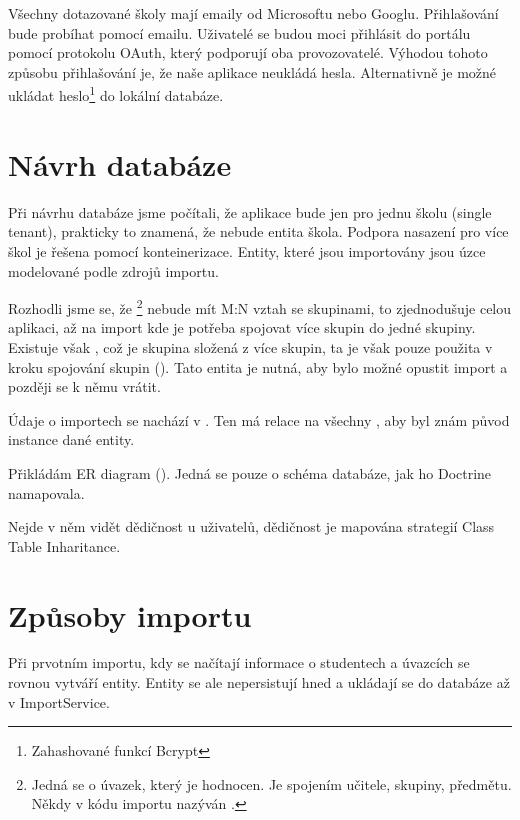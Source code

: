 Všechny dotazované školy mají emaily od Microsoftu nebo Googlu.
Přihlašování bude probíhat pomocí emailu. Uživatelé se budou moci přihlásit do portálu pomocí protokolu OAuth, který podporují oba provozovatelé. Výhodou tohoto způsobu přihlašování je, že naše aplikace neukládá hesla. Alternativně je možné ukládat heslo\footnote{Zahashované funkcí Bcrypt} do lokální databáze.



\section{Návrh databáze}

Při návrhu databáze jsme počítali, že aplikace bude jen pro jednu školu (single tenant), prakticky to znamená, že nebude entita škola. 
Podpora nasazení pro více škol je řešena pomocí konteinerizace.
Entity, které jsou importovány jsou úzce modelované podle zdrojů importu.

Rozhodli jsme se, že \footnote{Jedná se o úvazek, který je hodnocen. Je spojením učitele, skupiny, předmětu. Někdy v kódu importu nazýván .} 
nebude mít M:N vztah se skupinami, to zjednodušuje celou aplikaci, až na import kde je potřeba spojovat více skupin do jedné skupiny.
Existuje však , což je skupina složená z více skupin, ta je však pouze použita v kroku spojování skupin ().
Tato entita je nutná, aby bylo možné opustit import a později se k němu vrátit.

Údaje o importech se nachází v . Ten má relace na všechny , aby byl znám původ instance dané entity.

Přikládám ER diagram (). Jedná se pouze o schéma databáze, jak ho Doctrine namapovala.

Nejde v něm vidět dědičnost u uživatelů, dědičnost je mapována strategií Class Table Inharitance\cite{P-of-EAA}.






\section{Způsoby importu}
Při prvotním importu, kdy se načítají informace o studentech a úvazcích se rovnou vytváří entity. Entity se ale nepersistují hned a ukládají se do databáze až v ImportService.

